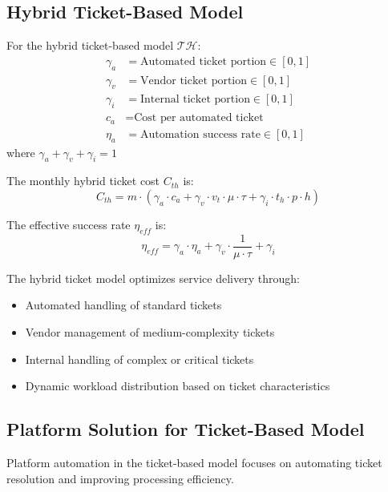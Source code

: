 \documentclass[12pt,a4paper]{article}
\newenvironment{definition}[1]
{\begin{mdframed}[style=definitionstyle,frametitle={Definition: #1}]}
{\end{mdframed}}
\newenvironment{explanation}
{\begin{mdframed}[style=explanationstyle,frametitle={Explanation}]}
{\end{mdframed}}
\begin{document}
\subsection{Hybrid Ticket-Based Model}
\begin{definition}{Hybrid Ticket Variables}
For the hybrid ticket-based model $\mathcal{TH}$:
\begin{align*}
    \gamma_a &= \text{Automated ticket portion} \in [0,1] \\
    \gamma_v &= \text{Vendor ticket portion} \in [0,1] \\
    \gamma_i &= \text{Internal ticket portion} \in [0,1] \\
    c_a &= \text{Cost per automated ticket} \\
    \eta_a &= \text{Automation success rate} \in [0,1]
\end{align*}
where $\gamma_a + \gamma_v + \gamma_i = 1$
\end{definition}

\begin{definition}{Hybrid Ticket Cost}
The monthly hybrid ticket cost $C_{th}$ is:
\begin{equation}
    C_{th} = m \cdot (\gamma_a \cdot c_a + \gamma_v \cdot v_t \cdot \mu \cdot \tau + \gamma_i \cdot t_h \cdot p \cdot h)
\end{equation}

The effective success rate $\eta_{eff}$ is:
\begin{equation}
    \eta_{eff} = \gamma_a \cdot \eta_a + \gamma_v \cdot \frac{1}{\mu \cdot \tau} + \gamma_i
\end{equation}
\end{definition}

\begin{explanation}
The hybrid ticket model optimizes service delivery through:
\begin{itemize}
    \item Automated handling of standard tickets
    \item Vendor management of medium-complexity tickets
    \item Internal handling of complex or critical tickets
    \item Dynamic workload distribution based on ticket characteristics
\end{itemize}
\end{explanation}

\subsection{Platform Solution for Ticket-Based Model}
Platform automation in the ticket-based model focuses on automating ticket resolution and improving processing efficiency.
\end{document}

